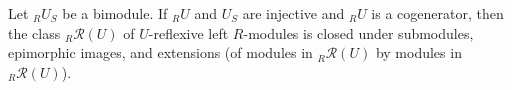 Let ${}_R U_S$ be a bimodule. If ${}_R U$ and $U_S$ are injective and ${}_R U$ is a cogenerator, then the class ${}_R \mathcal{R}(U)$ of $U$-reflexive left $R$-modules is closed under submodules, epimorphic images, and extensions (of modules in ${}_R \mathcal{R}(U)$ by modules in ${}_R \mathcal{R}(U)$).
